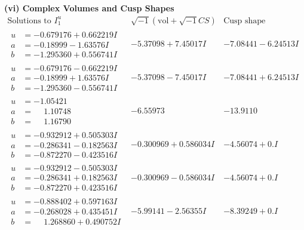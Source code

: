\documentclass[1p]{elsarticle_modified}
\theoremstyle{definition}
\newcommand{\I}{\sqrt{-1}}
\begin{document}
\newpage\flushleft \textbf{(vi) Complex Volumes and Cusp Shapes}
$$\begin{array}{c|c|c}  
\text{Solutions to }I^u_{1}& \I (\text{vol} + \sqrt{-1}CS) & \text{Cusp shape}\\
 \hline 
\begin{aligned}
u &= -0.679176 + 0.662219 I \\
a &= -0.18999 - 1.63576 I \\
b &= -1.295360 + 0.556741 I\end{aligned}
 & -5.37098 + 7.45017 I & -7.08441 - 6.24513 I \\ \hline\begin{aligned}
u &= -0.679176 - 0.662219 I \\
a &= -0.18999 + 1.63576 I \\
b &= -1.295360 - 0.556741 I\end{aligned}
 & -5.37098 - 7.45017 I & -7.08441 + 6.24513 I \\ \hline\begin{aligned}
u &= -1.05421\phantom{ +0.000000I} \\
a &= \phantom{-}1.10748\phantom{ +0.000000I} \\
b &= \phantom{-}1.16790\phantom{ +0.000000I}\end{aligned}
 & -6.55973\phantom{ +0.000000I} & -13.9110\phantom{ +0.000000I} \\ \hline\begin{aligned}
u &= -0.932912 + 0.505303 I \\
a &= -0.286341 - 0.182563 I \\
b &= -0.872270 - 0.423516 I\end{aligned}
 & -0.300969 + 0.586034 I & -4.56074 + 0. I\phantom{ +0.000000I} \\ \hline\begin{aligned}
u &= -0.932912 - 0.505303 I \\
a &= -0.286341 + 0.182563 I \\
b &= -0.872270 + 0.423516 I\end{aligned}
 & -0.300969 - 0.586034 I & -4.56074 + 0. I\phantom{ +0.000000I} \\ \hline\begin{aligned}
u &= -0.888402 + 0.597163 I \\
a &= -0.268028 + 0.435451 I \\
b &= \phantom{-}1.268860 + 0.490752 I\end{aligned}
 & -5.99141 - 2.56355 I & -8.39249 + 0. I\phantom{ +0.000000I} \\ \hline\begin{aligned}

\end{aligned}
\end{array}$$
\end{document}
